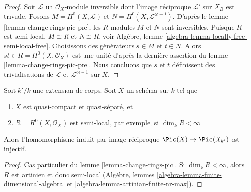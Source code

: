 \begin{proof}
 Soit $\mathcal{L}$ un $\mathcal{O}_X$-module inversible
dont l'image réciproque $\mathcal{L}'$ sur $X_B$ est triviale.
Posons $M = H^0(X, \mathcal{L})$ et $N = H^0(X, \mathcal{L}^{\otimes - 1})$.
D'après le lemme \ref{lemma-change-rings-pic-pre}, les $R$-modules $M$ et $N$
 sont inversibles. Puisque $R$ est semi-local, $M \cong R$ et $N \cong R$,
voir Algèbre, lemme \ref{algebra-lemma-locally-free-semi-local-free}.
Choisissons des générateurs $s \in M$ et $t \in N$. Alors 
$st \in R = H^0(X, \mathcal{O}_X)$ est une unité d'après la dernière assertion
du lemme \ref{lemma-change-rings-pic-pre}.
Nous concluons que $s$ et $t$ définissent des trivialisations de $\mathcal{L}$ et 
$\mathcal{L}^{\otimes -1}$ sur $X$. 
\end{proof}

\begin{lemma}
\label{lemma-change-fields-pic}
 Soit $k'/k$ une extension de corps. Soit
$X$ un schéma sur $k$ tel que 
\begin{enumerate}
\item $X$ est quasi-compact et quasi-séparé, et 
\item $R = H^0(X, \mathcal{O}_X)$ est semi-local, par exemple, si $\dim_k R < \infty$. 
\end{enumerate}
 Alors l'homomorphisme induit par image réciproque $\Pic(X) \to \Pic(X_{k'})$ est injectif. 
\end{lemma}

\begin{proof}
 Cas particulier du lemme \ref{lemma-change-rings-pic}.
Si $\dim_k R < \infty$, alors 
$R$ est artinien et donc semi-local (Algèbre, lemmes 
\ref{algebra-lemma-finite-dimensional-algebra} et 
\ref{algebra-lemma-artinian-finite-nr-max}). 
\end{proof}

